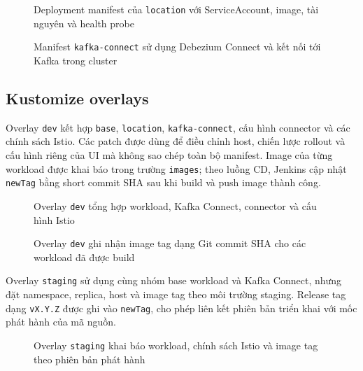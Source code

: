 \begin{figure}[H]
\centering
{}
\caption{Deployment manifest của \texttt{location} với ServiceAccount, image, tài nguyên và health probe}
\end{figure}

\begin{figure}[H]
\centering
{}
\caption{Manifest \texttt{kafka-connect} sử dụng Debezium Connect và kết nối tới Kafka trong cluster}
\end{figure}

\subsection{Kustomize overlays}

Overlay \texttt{dev} kết hợp \texttt{base}, \texttt{location}, \texttt{kafka-connect}, cấu hình connector và các chính sách Istio. Các patch được dùng để điều chỉnh host, chiến lược rollout và cấu hình riêng của UI mà không sao chép toàn bộ manifest. Image của từng workload được khai báo trong trường \texttt{images}; theo luồng CD, Jenkins cập nhật \texttt{newTag} bằng short commit SHA sau khi build và push image thành công.

\begin{figure}[H]
\centering
{}
\caption{Overlay \texttt{dev} tổng hợp workload, Kafka Connect, connector và cấu hình Istio}
\end{figure}

\begin{figure}[H]
\centering
{}
\caption{Overlay \texttt{dev} ghi nhận image tag dạng Git commit SHA cho các workload đã được build}
\end{figure}

Overlay \texttt{staging} sử dụng cùng nhóm base workload và Kafka Connect, nhưng đặt namespace, replica, host và image tag theo môi trường staging. Release tag dạng \texttt{vX.Y.Z} được ghi vào \texttt{newTag}, cho phép liên kết phiên bản triển khai với mốc phát hành của mã nguồn.

\begin{figure}[H]
\centering
{}
\caption{Overlay \texttt{staging} khai báo workload, chính sách Istio và image tag theo phiên bản phát hành}
\end{figure}

